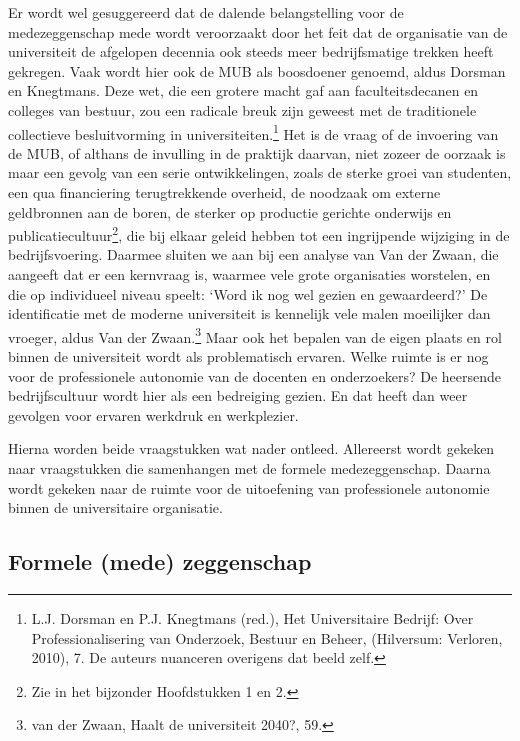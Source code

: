 \documentclass{jote-book}
\begin{document}
	Er wordt wel gesuggereerd dat de dalende belangstelling voor de medezeggenschap mede wordt veroorzaakt door het feit dat de organisatie van de universiteit de afgelopen decennia ook steeds meer bedrijfsmatige trekken heeft gekregen. Vaak wordt hier ook de MUB als boosdoener genoemd, aldus Dorsman en Knegtmans. Deze wet, die een grotere macht gaf aan faculteitsdecanen en colleges van bestuur, zou een radicale breuk zijn geweest met de traditionele collectieve besluitvorming in universiteiten.\footnote{L.J. Dorsman en P.J. Knegtmans (red.), Het Universitaire Bedrijf: Over Professionalisering van Onderzoek, Bestuur en Beheer, (Hilversum: Verloren, 2010), 7. De auteurs nuanceren overigens dat beeld zelf.} Het is de vraag of de invoering van de MUB, of althans de invulling in de praktijk daarvan, niet zozeer de oorzaak is maar een gevolg van een serie ontwikkelingen, zoals de sterke groei van studenten, een qua financiering terugtrekkende overheid, de noodzaak om externe geldbronnen aan de boren, de sterker op productie gerichte onderwijs en publicatiecultuur\footnote{Zie in het bijzonder Hoofdstukken 1 en 2.}, die bij elkaar geleid hebben tot een ingrijpende wijziging in de bedrijfsvoering. Daarmee sluiten we aan bij een analyse van Van der Zwaan, die aangeeft dat er een kernvraag is, waarmee vele grote organisaties worstelen, en die op individueel niveau speelt: ‘Word ik nog wel gezien en gewaardeerd?' De identificatie met de moderne universiteit is kennelijk vele malen moeilijker dan vroeger, aldus Van der Zwaan.\footnote{van der Zwaan, Haalt de universiteit 2040?, 59.} Maar ook het bepalen van de eigen plaats en rol binnen de universiteit wordt als problematisch ervaren. Welke ruimte is er nog voor de professionele autonomie van de docenten en onderzoekers? De heersende bedrijfscultuur wordt hier als een bedreiging gezien. En dat heeft dan weer gevolgen voor ervaren werkdruk en werkplezier.



	Hierna worden beide vraagstukken wat nader ontleed. Allereerst wordt gekeken naar vraagstukken die samenhangen met de formele medezeggenschap. Daarna wordt gekeken naar de ruimte voor de uitoefening van professionele autonomie binnen de universitaire organisatie.



	\subsection{Formele (mede) zeggenschap}
\end{document}
